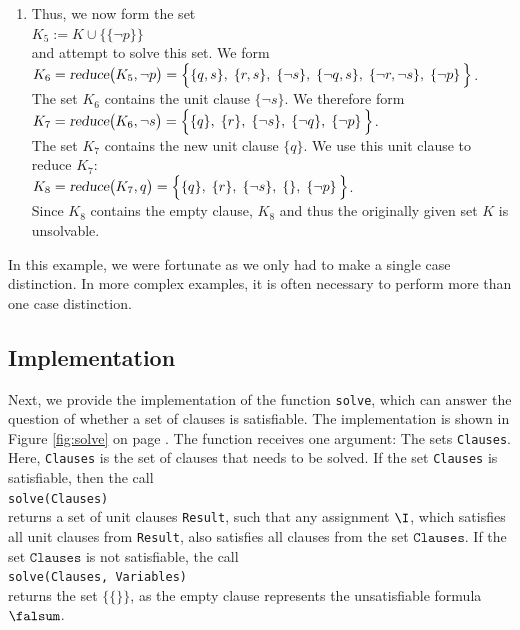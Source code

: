 \begin{enumerate}
\item Thus, we now form the set
      \\[0.2cm]
      \hspace*{1.3cm} $K_5 := K \cup \bigl\{ \{\neg p\} \bigr\}$ \\[0.2cm]
      and attempt to solve this set. We form
      \\[0.2cm]
      \hspace*{1.3cm} 
      $K_6 = \textsl{reduce}\bigl(K_5, \neg p\bigr) =
      \Big\{ \{q, s\},\; \{r, s\},\;\{\neg s\},\; \{\neg q, s\},\; \{\neg r, \neg s\},\;\{\neg p\}\, \Big\}$.
      \\[0.2cm]
      The set $K_6$ contains the unit clause $\{\neg s\}$.
      We therefore form \\[0.2cm]
      \hspace*{1.3cm} 
      $K_7 = \textsl{reduce}\bigl(K_6, \neg s\bigr) =\Big\{ \{q\},\; \{r\},\;\{\neg s\},\; \{\neg q\},\;\{\neg p\}\, \Big\}$.
      \\[0.2cm]
      The set $K_7$ contains the new unit clause $\{q\}$.  We use this unit clause to reduce $K_7$:
      \\[0.2cm]
      \hspace*{1.3cm} 
      $K_8 = \textsl{reduce}\bigl(K_7, q \bigr) =\Big\{ \{q\},\; \{r\},\;\{\neg s\},\; \{\},\;\{\neg p\}\, \Big\}$.
      \\[0.2cm]
      Since $K_8$ contains the empty clause, $K_8$ and thus the originally
      given set $K$ is unsolvable.
\end{enumerate}
In this example, we were fortunate as we only had to make a single case distinction.
In more complex examples, it is often necessary to perform more than one case distinction.

\subsection{Implementation}
Next, we provide the implementation of the function \texttt{solve}, 
which can answer the question of whether a set of clauses is satisfiable. The
implementation is shown in Figure \ref{fig:solve} on page \pageref{fig:solve}.
The function receives one argument: The sets \texttt{Clauses}.
Here, \texttt{Clauses} is the set of clauses that needs to be solved. If the set \texttt{Clauses} is
satisfiable, then the call 
\\[0.2cm]
\hspace*{1.3cm}
\texttt{solve(Clauses)} 
\\[0.2cm]
returns a set of unit clauses \texttt{Result}, such
that any assignment $\I$, which satisfies all unit clauses from \texttt{Result}, also satisfies all clauses from
the set $\texttt{Clauses}$. If the set $\texttt{Clauses}$ is not satisfiable, the call
\\[0.2cm]
\hspace*{1.3cm}
\texttt{solve(Clauses, Variables)} 
\\[0.2cm]
returns the set $\bigl\{ \{\} \bigr\}$, as the empty clause represents the unsatisfiable formula $\falsum$.
 
